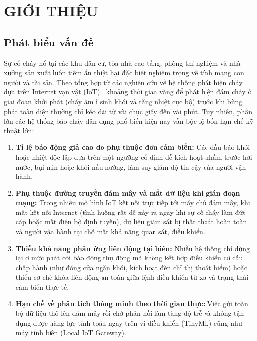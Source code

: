
\section{GIỚI THIỆU}
\label{sec:gioi-thieu}

\subsection{Phát biểu vấn đề}
\label{subsec:phat-bieu-van-de}

Sự cố cháy nổ tại các khu dân cư, tòa nhà cao tầng, phòng thí nghiệm và nhà xưởng sản xuất luôn tiềm ẩn thiệt hại đặc biệt nghiêm trọng về tính mạng con người và tài sản. Theo tổng hợp từ các nghiên cứu về hệ thống phát hiện cháy dựa trên Internet vạn vật (IoT) \cite{ref_fire_survey}, khoảng thời gian vàng để phát hiện đám cháy ở giai đoạn khởi phát (cháy âm ỉ sinh khói và tăng nhiệt cục bộ) trước khi bùng phát toàn diện thường chỉ kéo dài từ vài chục giây đến vài phút. Tuy nhiên, phần lớn các hệ thống báo cháy dân dụng phổ biến hiện nay vẫn bộc lộ bốn hạn chế kỹ thuật lớn:

\begin{enumerate}[leftmargin=*, itemsep=3pt]
  \item \textbf{Tỉ lệ báo động giả cao do phụ thuộc đơn cảm biến:} Các đầu báo khói hoặc nhiệt độc lập dựa trên một ngưỡng cố định dễ kích hoạt nhầm trước hơi nước, bụi mịn hoặc khói nấu nướng, làm suy giảm độ tin cậy của người vận hành.
  \item \textbf{Phụ thuộc đường truyền đám mây và mất dữ liệu khi gián đoạn mạng:} Trong nhiều mô hình IoT kết nối trực tiếp tới máy chủ đám mây, khi mất kết nối Internet (tình huống rất dễ xảy ra ngay khi sự cố cháy làm đứt cáp hoặc mất điện bộ định tuyến), dữ liệu giám sát bị thất thoát hoàn toàn và người vận hành tại chỗ mất khả năng quan sát, điều khiển.
  \item \textbf{Thiếu khả năng phản ứng liên động tại biên:} Nhiều hệ thống chỉ dừng lại ở mức phát còi báo động thụ động mà không kết hợp điều khiển cơ cấu chấp hành (như đóng cửa ngăn khói, kích hoạt đèn chỉ thị thoát hiểm) hoặc thiếu cơ chế khóa liên động an toàn giữa lệnh điều khiển từ xa và trạng thái cảm biến thực tế.
  \item \textbf{Hạn chế về phân tích thông minh theo thời gian thực:} Việc gửi toàn bộ dữ liệu thô lên đám mây rồi chờ phản hồi làm tăng độ trễ và không tận dụng được năng lực tính toán ngay trên vi điều khiển (TinyML) cũng như máy tính biên (Local IoT Gateway).
\end{enumerate}

